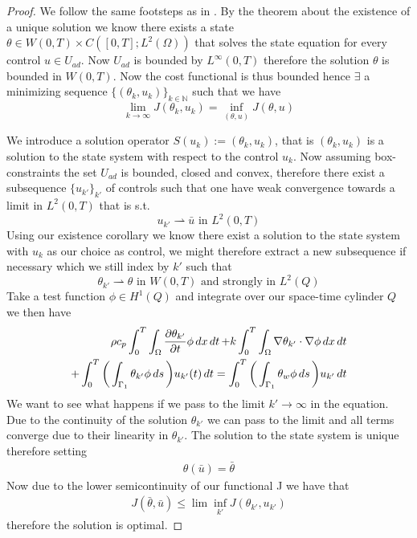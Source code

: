 \begin{proof}
We follow the same footsteps as in  \cite{DPSteel}. By the theorem about the existence of a unique solution we know there exists a state $\theta \in W(0,T) \times C([0,T];L^2(\Omega))$ that solves the state equation for every control $u \in U_{ad}$. Now $U_{ad}$ is bounded by $L^{\infty}(0,T)$ therefore the solution $\theta$ is bounded in $W(0,T)$. Now the cost functional is thus bounded hence $\exists$ a minimizing sequence $\{(\theta_k,u_k)\}_{k\in \mathbb{N}}$ such that we have 
\begin{equation*}
    \lim_{k\rightarrow \infty}J(\theta_k,u_k) = \inf_{(\theta,u)}J(\theta,u)
\end{equation*}

We introduce a solution operator $S(u_k):= (\theta_k, u_k)$, that is $(\theta_k,u_k)$ is a solution to the state system with respect to the control $u_k$. Now assuming box-constraints the set $U_{ad}$ is bounded, closed and convex, therefore there exist a subsequence $\{u_{k'} \}_{k'}$ of controls such that one have weak convergence towards a limit in $L^2(0,T)$ that is s.t.
\begin{equation*}
    u_{k'} \rightharpoonup \bar{u} \text{ in } L^2(0,T)
\end{equation*}
Using our existence corollary we know there exist a solution to the state system with $u_k$ as our choice as control, we might therefore extract a new subsequence if necessary which we still index by $k'$ such that
\begin{equation*}
    \theta_{k'} \rightharpoonup \theta \text{ in } W(0,T) \text{ and strongly in } L^2(Q)
\end{equation*}
Take a test function $\phi \in H^1(Q)$ and integrate over our space-time cylinder $Q$ we then have 
\begin{align*}
    \rho c_p \int_0^T\int_{\Omega}\frac{\partial \theta_{k'}}{\partial t}\phi \mathop{dx}\mathop{dt} + k \int_0^T \int_{\Omega}\nabla \theta_{k'} \cdot \nabla \phi \mathop{dx}\mathop{dt} \\ + \int_0^T \bigg (\int_{\Gamma_1}\theta_{k'}\phi \mathop{ds} \bigg )u_{k'}(t) \mathop{dt} =
    \int_0^T \bigg (\int_{\Gamma_1}\theta_w\phi \mathop{ds} \bigg ) u_{k'} \mathop{dt} 
\end{align*}
We want to see what happens if we pass to the limit $k' \rightarrow \infty$ in the equation. Due to the continuity of the solution $\theta_{k'}$ we can pass to the limit and all terms converge due to their linearity in $\theta_{k'}$. The solution to the state system is unique therefore setting
\begin{align*}
    \theta(\bar{u}) = \bar{\theta} 
\end{align*}
Now due to the lower semicontinuity of our functional J we have that 
\begin{align*}
    J(\bar{\theta}, \bar{u}) \leq \lim \inf_{k'} J(\theta_{k'}, u_{k'})
\end{align*}
therefore the solution is optimal. 
\end{proof}